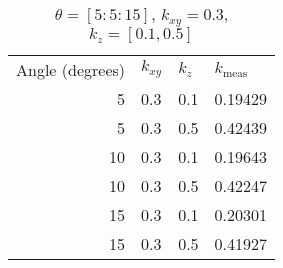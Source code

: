 \begin{table}
\caption{\(\theta=[5:5:15]\), \(k_{xy} = 0.3\), \(k_z = [0.1, 0.5]\)}
\begin{tabular}{r l l | l}
Angle (degrees) & \(k_{xy}\) & \(k_z\) & \(k_{\textrm{meas}}\)\\
5 & 0.3 & 0.1 & 0.19429\\
5 & 0.3 & 0.5 & 0.42439\\
10 & 0.3 & 0.1 & 0.19643\\
10 & 0.3 & 0.5 & 0.42247\\
15 & 0.3 & 0.1 & 0.20301\\
15 & 0.3 & 0.5 & 0.41927\\
\end{tabular}
\end{table}
